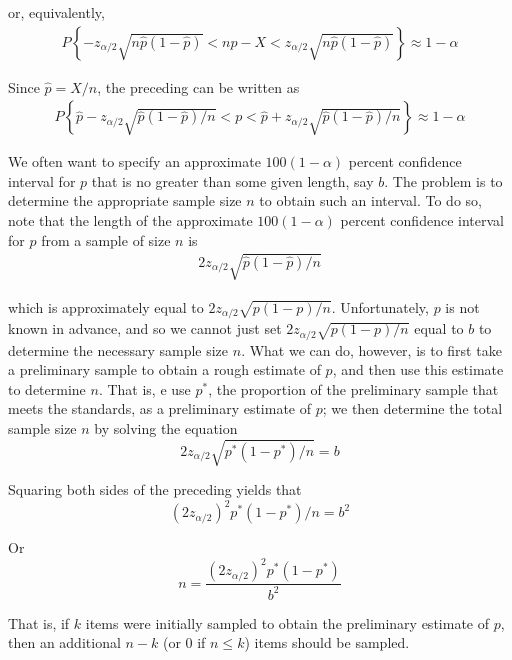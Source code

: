 \documentclass[12pt]{article}
\begin{document}
or, equivalently,
\begin{eqnarray*}
  P \left\{ - z_{\alpha /2} \sqrt {n\hat{p}(1-\hat{p})} <
    np - X < z_{\alpha /2} \sqrt {n\hat{p}(1-\hat{p})}
  \right\} \approx 1 - \alpha
\end{eqnarray*}

Since $\hat{p} = X/n$, the preceding can be written as
\begin{eqnarray*}
  P \left\{\hat{p} - z_{\alpha /2} \sqrt {\hat{p}(1-\hat{p}) / n} <
    p < \hat{p} + z_{\alpha /2} \sqrt {\hat{p}(1-\hat{p}) / n}
  \right\} \approx 1 - \alpha
\end{eqnarray*}

We often want to specify an approximate $100(1 - \alpha)$ percent confidence interval for $p$ that is no greater than some given length, say $b$. The problem is to determine the appropriate sample size $n$ to obtain such an interval. To do so, note that the length of the approximate $100(1 - \alpha)$ percent confidence interval for $p$ from a sample of size $n$ is
\begin{eqnarray*}
  2 z_{\alpha / 2} \sqrt {\hat{p} (1 - \hat{p}) / n}
\end{eqnarray*}

which is approximately equal to $2 z_{\alpha / 2} \sqrt {p(1-p)/n}$. Unfortunately, $p$ is not known in advance, and so we cannot just set $2 z_{\alpha / 2} \sqrt {p(1-p)/n}$ equal to $b$ to determine the necessary sample size $n$. What we can do, however, is to first take a preliminary sample to obtain a rough estimate of $p$, and then use this estimate to determine $n$. That is, e use $p^*$, the proportion of the preliminary sample that meets the standards, as a preliminary estimate of $p$; we then determine the total sample size $n$ by solving the equation
\begin{equation*}
  2 z_{\alpha / 2} \sqrt {p^* (1 - p^*) / n} = b
\end{equation*}

Squaring both sides of the preceding yields that
\begin{equation*}
  (2 z_{\alpha / 2})^2 p^* (1 - p^*) / n = b^2
\end{equation*}

Or
\begin{equation*}
  n = \frac {(2 z_{\alpha / 2})^2 p^* (1 - p^*)}{b^2}
\end{equation*}

That is, if $k$ items were initially sampled to obtain the preliminary estimate of $p$, then an additional $n-k$ (or 0 if $n \le k$) items should be sampled.
\end{document}

